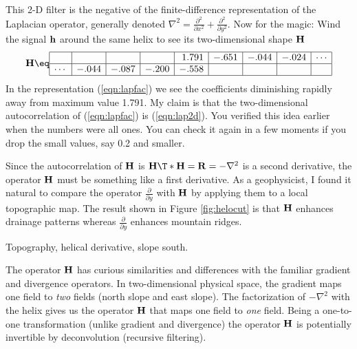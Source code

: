This 2-D filter is the negative of the finite-difference representation
of the Laplacian operator, generally denoted
$\nabla^2 = \frac{\partial^2}{ \partial x^2} + \frac{\partial^2}{ \partial y^2} $.
Now for the magic:
Wind the signal $\bold h$ around the same helix
to see its two-dimensional shape $\bold H$
\begin{equation}
\label{eqn:lapfac}
 {\bold H}
\eq
    \begin{array} {|r|r|r|r|r|r|r|r|r|} \hline
             &      &       &       & 1.791 &  -.651 & -.044  & -.024& \cdots \\
	     \hline 
      \cdots &-.044 & -.087 & -.200 & -.558 &        &        &      &
     \\ \hline
    \end{array}
\end{equation}
In the representation (\ref{eqn:lapfac}) we see the coefficients diminishing
rapidly away from maximum value 1.791.
My claim is that the two-dimensional autocorrelation of (\ref{eqn:lapfac})
is (\ref{eqn:lap2d}).
You verified this idea earlier when the numbers were all ones.
You can check it again in a few moments
if you drop the small values, say 0.2 and smaller.


\par
Since the autocorrelation of ${\bold H}$ is
${\bold H}\T \ast {\bold H} = \bold R =-\nabla^2$
is a second derivative,
the operator $\bold H$ must be something like a first derivative.
As a geophysicist, I found it natural to compare
the operator $\frac{\partial}{\partial y}$
with $\bold H$ by applying them to a local topographic map.
The result shown in
Figure \ref{fig:helocut}
is that $\bold H$ enhances drainage patterns whereas
$\frac{\partial}{\partial y}$ enhances mountain ridges.


 {
  Topography, helical derivative, slope south.
}

\par
The operator $\bold H$ has
curious similarities and differences
with the familiar gradient and divergence operators.
In two-dimensional physical space,
the gradient maps one field to {\em two} fields
(north slope and east slope).
The factorization of $-\nabla^2$ with the helix
gives us the operator $\bold H$
that maps one field to {\em  one} field.
Being a one-to-one transformation
(unlike gradient and divergence)
the operator $\bold H$ is potentially invertible
by deconvolution (recursive filtering).

